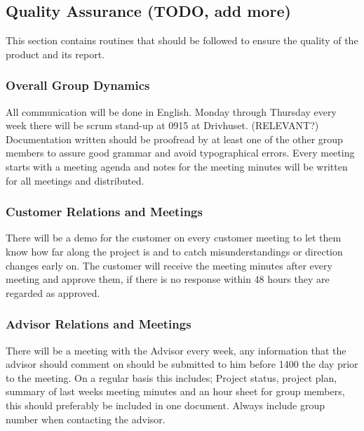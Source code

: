 \subsection{Quality Assurance (TODO, add more)}

This section contains routines that should be followed to ensure the 
quality of the product and its report.

\subsubsection{Overall Group Dynamics}

All communication will be done in English.
Monday through Thursday every week there will be scrum stand-up at 0915 at Drivhuset. (RELEVANT?)
Documentation written should be proofread by at least one of the other group members 
to assure good grammar and avoid typographical errors.
Every meeting starts with a meeting agenda and notes for the meeting minutes will be
written for all meetings and distributed.

\subsubsection{Customer Relations and Meetings}

There will be a demo for the customer on every customer meeting to let them
know how far along the project is and to catch misunderstandings or direction changes early on.
The customer will receive the meeting minutes after every meeting and approve them, 
if there is no response within 48 hours they are regarded as approved.

\subsubsection{Advisor Relations and Meetings}

There will be a meeting with the Advisor every week, any information that the advisor
should comment on should be submitted to him before 1400 the day prior to the meeting.
On a regular basis this includes; Project status, project plan, summary of last weeks
meeting minutes and an hour sheet for group members, this should preferably be included in one document.
Always include group number when contacting the advisor.
